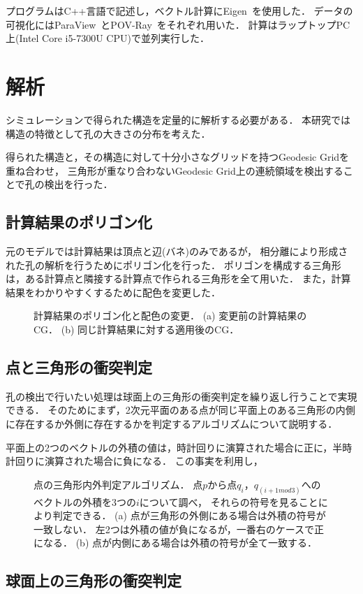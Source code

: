 プログラムはC++言語で記述し，ベクトル計算にEigen~\cite{eigenweb}を使用した．
データの可視化にはParaView~\cite{paraview}とPOV-Ray~\cite{povray}をそれぞれ用いた．
計算はラップトップPC上(Intel Core i5-7300U CPU)で並列実行した．


\section{解析}
シミュレーションで得られた構造を定量的に解析する必要がある．
本研究では構造の特徴として孔の大きさの分布を考えた．

得られた構造と，その構造に対して十分小さなグリッドを持つGeodesic Gridを重ね合わせ，
三角形が重なり合わないGeodesic Grid上の連続領域を検出することで孔の検出を行った．

\subsection{計算結果のポリゴン化}
元のモデルでは計算結果は頂点と辺(バネ)のみであるが，
相分離により形成された孔の解析を行うためにポリゴン化を行った．
ポリゴンを構成する三角形は，ある計算点と隣接する計算点で作られる三角形を全て用いた．
また，計算結果をわかりやすくするために配色を変更した．


\begin{figure}
\centering

\caption{
    計算結果のポリゴン化と配色の変更．
    (a) 変更前の計算結果のCG．
    (b) 同じ計算結果に対する適用後のCG．
}
\label{fig:model_2d}
\end{figure}


\subsection{点と三角形の衝突判定}
孔の検出で行いたい処理は球面上の三角形の衝突判定を繰り返し行うことで実現できる．
そのためにまず，2次元平面のある点が同じ平面上のある三角形の内側に存在するか外側に存在するかを判定するアルゴリズムについて説明する．

平面上の2つのベクトルの外積の値は，時計回りに演算された場合に正に，半時計回りに演算された場合に負になる．
この事実を利用し，

\begin{figure}
\centering

\caption{
    点の三角形内外判定アルゴリズム．
    点$p$から点$q_i$，$q_{(i+1 mod 3)}$へのベクトルの外積を3つの$i$について調べ，
    それらの符号を見ることにより判定できる．
    (a) 点が三角形の外側にある場合は外積の符号が一致しない．
        左2つは外積の値が負になるが，一番右のケースで正になる．
    (b) 点が内側にある場合は外積の符号が全て一致する．
}
\label{fig:point_triangle}
\end{figure}

\subsection{球面上の三角形の衝突判定}
